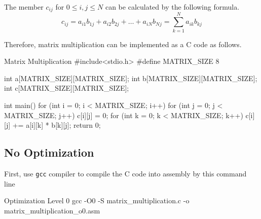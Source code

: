 \documentclass[12pt, a4paper]{article}
\begin{document}
            \noindent The member $c_{ij}$ for $0 \leq i, j \leq N$ can be calculated by the following formula.
            $$c_{ij} = a_{i1} b_{1j} + a_{i2} b_{2j} + \dots + a_{iN} b_{Nj} = \sum_{k = 1}^{N} a_{ik} b_{kj}$$

            \noindent Therefore, matrix multiplication can be implemented as a C code as follows.
            \begin{codeblock}[minted language=c]{Matrix Multiplication}
                #include<stdio.h>
                #define MATRIX_SIZE 8

                int a[MATRIX_SIZE][MATRIX_SIZE];
                int b[MATRIX_SIZE][MATRIX_SIZE];
                int c[MATRIX_SIZE][MATRIX_SIZE];

                int main() {
                    for (int i = 0; i < MATRIX_SIZE; i++) {
                        for (int j = 0; j < MATRIX_SIZE; j++) {
                            c[i][j] = 0;
                            for (int k = 0; k < MATRIX_SIZE; k++) {
                                c[i][j] += a[i][k] * b[k][j];
                            }
                        }
                    }
                    return 0;
                }
            \end{codeblock}

    \pagebreak

        \subsection{No Optimization}
            First, use \texttt{gcc} compiler to compile the C code into assembly by this command line
            \begin{codeblock}[minted language=bat]{Optimization Level 0}
                gcc -O0 -S matrix_multiplication.c -o matrix_multiplication_o0.asm
            \end{codeblock}
\end{document}
